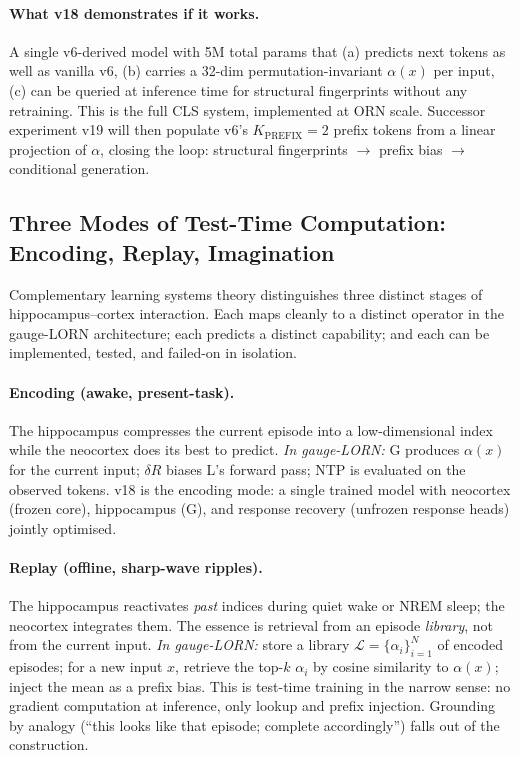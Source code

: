 \documentclass[11pt, a4paper]{article}
\theoremstyle{plain}
\theoremstyle{definition}
\theoremstyle{remark}
\begin{document}
\paragraph{What v18 demonstrates if it works.}
A single v6-derived model with 5M total params that (a) predicts next tokens as well as vanilla v6, (b) carries a 32-dim permutation-invariant $\alpha(x)$ per input, (c) can be queried at inference time for structural fingerprints without any retraining.
This is the full CLS system, implemented at ORN scale.
Successor experiment v19 will then populate v6's $K_{\mathrm{PREFIX}}{=}2$ prefix tokens from a linear projection of $\alpha$, closing the loop: structural fingerprints $\to$ prefix bias $\to$ conditional generation.

\subsection{Three Modes of Test-Time Computation: Encoding, Replay, Imagination}
\label{sec:three-modes}

Complementary learning systems theory distinguishes three distinct stages of hippocampus--cortex interaction.
Each maps cleanly to a distinct operator in the gauge-LORN architecture; each predicts a distinct capability; and each can be implemented, tested, and failed-on in isolation.

\paragraph{Encoding (awake, present-task).}
The hippocampus compresses the current episode into a low-dimensional index while the neocortex does its best to predict.
\emph{In gauge-LORN:} G produces $\alpha(x)$ for the current input; $\delta R$ biases L's forward pass; NTP is evaluated on the observed tokens.
v18 is the encoding mode: a single trained model with neocortex (frozen core), hippocampus (G), and response recovery (unfrozen response heads) jointly optimised.

\paragraph{Replay (offline, sharp-wave ripples).}
The hippocampus reactivates \emph{past} indices during quiet wake or NREM sleep; the neocortex integrates them.
The essence is retrieval from an episode \emph{library}, not from the current input.
\emph{In gauge-LORN:} store a library $\mathcal{L} = \{\alpha_i\}_{i=1}^{N}$ of encoded episodes; for a new input $x$, retrieve the top-$k$ $\alpha_i$ by cosine similarity to $\alpha(x)$; inject the mean as a prefix bias.
This is test-time training in the narrow sense: no gradient computation at inference, only lookup and prefix injection.
Grounding by analogy (``this looks like that episode; complete accordingly'') falls out of the construction.
\end{document}
